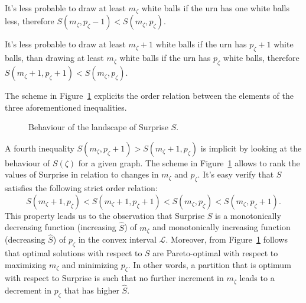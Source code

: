 \begin{props}\label{prop:prop2}
It's less probable to draw at least $m_\zeta$ white balls if the urn has one white balls less, therefore $S(m_\zeta,p_\zeta-1) < S(m_\zeta,p_\zeta)$.
\end{props}
\begin{props}\label{prop:prop3}
It's less probable to draw at least $m_\zeta+1$ white balls if the urn has $p_\zeta+1$ white balls, than drawing at least $m_\zeta$ white balls if the urn has $p_\zeta$ white balls, therefore $S(m_\zeta+1,p_\zeta+1) < S(m_\zeta,p_\zeta)$.
\end{props}
The scheme in Figure~\ref{fig:surprisebehaviour} explicits the order relation between the elements of the three aforementioned inequalities.
\begin{figure}[htb]
\centering
{}
\caption{Behaviour of the landscape of Surprise $S$.}
\label{fig:surprisebehaviour}
\end{figure}

A fourth inequality $S(m_\zeta,p_\zeta+1)>S(m_\zeta+1,p_\zeta)$ is implicit by looking at the behaviour of $S(\zeta)$ for a given graph. 
The scheme in Figure~\ref{fig:surprisebehaviour} allows to rank the values of Surprise in relation to changes in $m_\zeta$ and $p_\zeta$. It's easy  verify that $S$ satisfies the following strict order relation:
\begin{equation}\label{eq:surpriseorderrelation}
S(m_\zeta+1,p_\zeta)<S(m_\zeta+1,p_\zeta+1)<S(m_\zeta,p_\zeta)<S(m_\zeta,p_\zeta+1).
\end{equation}
This property leads us to the observation that Surprise $S$ is a monotonically decreasing function (increasing $\hat{S}$) of $m_\zeta$ and monotonically increasing function (decreasing $\hat{S}$) of $p_\zeta$ in the convex interval $\mathcal{L}$.
Moreover, from Figure~\ref{fig:surprisebehaviour} follows that optimal solutions with respect to $S$ are Pareto-optimal with respect to maximizing $m_\zeta$ and minimizing $p_\zeta$.
In other words, a partition that is optimum with respect to Surprise is such that no further increment in $m_\zeta$ leads to a decrement in $p_\zeta$ that has higher $\hat{S}$.

